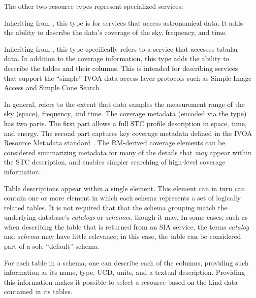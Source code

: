 \documentclass[11pt,a4paper]{ivoa}
\begin{document}
The other two resource types represent specialized services:


\begin{bigdescription}
\item[\xmlel{vs:DataService}]
Inheriting from , this type is for
       services that access astronomical data.  It adds the ability to
       describe the data's coverage of the
       sky, frequency, and time.

\item[\xmlel{vs:CatalogService}]
Inheriting from , this type
       specifically refers to a service that accesses tabular data.
       In addition to the coverage information, this type adds the
       ability to describe the tables and their columns.  This is
       intended for describing services that support the ``simple'' IVOA
       data access layer protocols such as Simple Image Access
        and Simple Cone Search.
\end{bigdescription}


In general,  refers to
the extent that data samples the measurement range of the sky (space),
frequency, and time.  The coverage metadata (encoded via the
 type) has two parts.  The first part
allows a full STC profile description in space, time, and energy.
The second part
captures key coverage metadata defined in the IVOA Resource Metadata
standard \citep{2007ivoa.spec.0302H}.  The RM-derived coverage elements can
be considered summarizing metadata for many of the details that
\emph{may} appear within the STC description, and enables simpler
searching of high-level coverage information.




Table descriptions appear within a single 
element.  This element can in turn can contain one or more
 element in which each schema
represents a set of logically related tables.  It is not required that 
that the schema grouping match the underlying database's
\emph{catalogs} or \emph{schemas}, though it may.  In some cases,
such as when describing the table that is returned from an SIA
service, the terms \emph{catalog} and \emph{schema} may have
little relevance; in this case, the table can be considered part of a
sole ``default'' schema.  



For each table in a schema, one can describe each of the columns,
providing such information as its name, type, UCD,
units, and a textual description.  Providing this information makes it
possible to select a resource based on the kind data contained in its
tables.  
\end{document}
